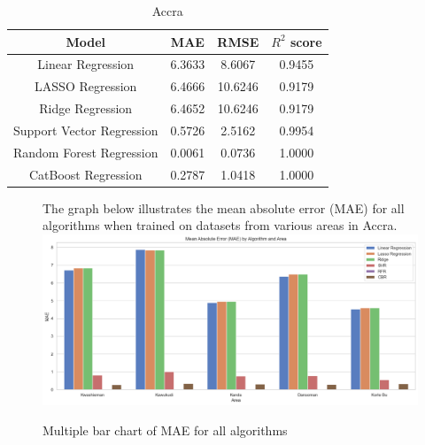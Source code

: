 \documentclass{book}
\numberwithin{equation}{section}
\numberwithin{figure}{section}
\begin{document}
\begin{table}[H]
    \centering
    \begin{tabular}{|c|c|c|c|}
        \hline
        Model & MAE & RMSE & $R^2$ score \\
        \hline
        Linear Regression & 6.3633 & 8.6067 & 0.9455 \\
        \hline
        LASSO Regression & 6.4666 & 10.6246 & 0.9179 \\
        \hline
        Ridge Regression & 6.4652 & 10.6246 &  0.9179 \\
        \hline
        Support Vector Regression &  0.5726 & 2.5162 & 0.9954 \\
        \hline
        Random Forest Regression & 0.0061 & 0.0736 & 1.0000 \\
        \hline
        CatBoost Regression & 0.2787 & 1.0418 & 1.0000 \\\hline
    \end{tabular}
    \caption{Accra}
   \label{tab: all areas}
\end{table}
\begin{figure}[H]
 \begin{minipage}{\linewidth}
        The graph below illustrates the mean absolute error (MAE) for all algorithms when trained on datasets from various areas in Accra.
        \vspace{0.5em} 
        \includegraphics[width=\linewidth]{MAE of all areas.png}
       
        \caption{ Multiple bar chart of MAE for all algorithms}
        \label{fig: Bar chart of the MAE for all algorithms}
    \end{minipage}
\end{figure}
\end{document}

